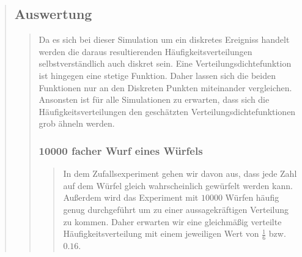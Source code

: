 \begin{quote}
	\subsection{Auswertung}
    \begin{quote}
        Da es sich bei dieser Simulation um ein diskretes Ereigniss handelt
        werden die daraus resultierenden Häufigkeitsverteilungen selbstverständlich auch diskret sein. 
        Eine Verteilungsdichtefunktion ist hingegen eine
        stetige Funktion. Daher lassen sich die beiden Funktionen nur an den Diskreten Punkten miteinander
        vergleichen.\\
        Ansonsten ist für alle Simulationen zu erwarten, dass sich die
        Häufigkeitsverteilungen den geschätzten Verteilungsdichtefunktionen grob ähneln werden.
        
        \subsubsection{10000 facher Wurf eines Würfels}
        \begin{quote}
                In dem Zufallsexperiment gehen wir davon aus, dass jede Zahl auf dem Würfel gleich wahrscheinlich
                gewürfelt werden kann. Außerdem wird das Experiment mit $10000$ Würfen häufig genug durchgeführt um zu
                einer aussagekräftigen Verteilung zu kommen. Daher erwarten wir eine gleichmäßig verteilte
                Häufigkeitsverteilung mit einem jeweiligen Wert von $\frac{1}{6}$ bzw. $0.16$.\\
                

\end{quote}
\end{quote}
\end{quote}
